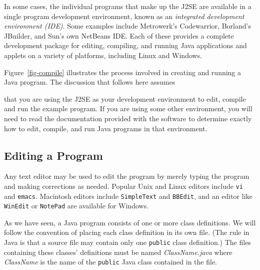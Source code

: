 In some cases, the individual programs that make up the J2SE are
available in a single program development environment, known as an
{\it integrated development environment (IDE)}. Some examples include
Metrowerk's Codewarrior, Borland's JBuilder, and Sun's own NetBeans
IDE.  Each of these provides a complete development package for
editing, compiling, and running Java applications and applets on
a variety of platforms, including Linux and Windows.

Figure~\ref{fig-compile} illustrates the process involved in creating
and running a Java program.  The discussion that follows here assumes
\begin{figure}[tb]
\figaleft{chptr01/compile.eps}{Editing, compiling, and running
{\tt HelloWorld.java}.
\label{fig-compile}
\label{pg-fig-compile}}
\end{figure}
that you are using the J2SE as your development environment to edit,
compile and run the example program.  If you are using some other
environment, you will need to read the documentation provided with the
software to determine exactly how to edit, compile, and run Java
programs in that environment.


\subsection{Editing a Program}

\noindent Any text editor may be used to edit the program by
merely typing the program and making corrections as needed.  Popular
Unix and Linux editors include {\tt vi} and {\tt emacs}. Macintosh
editors include {\tt SimpleText} and {\tt BBEdit}, and an editor like
{\tt WinEdit} or {\tt NotePad} are available for Windows.  

As we have seen, a Java program consists of one or more class
definitions.  We will follow the convention of placing each class
definition in its own file. (The rule in Java is that a source file
may contain only one {\tt public} class definition.)  The files
containing these classes' definitions must be named {\it
ClassName.java} where {\it ClassName} is the name of the {\tt public}
Java class contained in the file.


